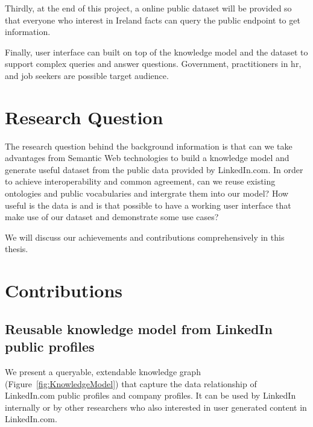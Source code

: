 Thirdly, at the end of this project, a online public dataset will be provided so that everyone who interest in Ireland facts can query the public endpoint to get information.

Finally, user interface can built on top of the knowledge model and the dataset to support complex queries and answer questions. Government, practitioners in \gls{hr}, and job seekers are possible target audience.

%
%

\section{Research Question}
The research question behind the background information is that can we take advantages from Semantic Web technologies to build a knowledge model and generate useful dataset from the public data provided by LinkedIn.com. In order to achieve interoperability and common agreement, can we reuse existing ontologies and public vocabularies and intergrate them into our model? How useful is the data is and is that possible to have a working user interface that make use of our dataset and demonstrate some use cases?

We will discuss our achievements and contributions comprehensively in this thesis.

\section{Contributions}
\subsection{Reusable knowledge model from LinkedIn public profiles}
We present a queryable, extendable knowledge graph (Figure~\ref{fig:KnowledgeModel}) that capture the data relationship of LinkedIn.com public profiles and company profiles. It can be used by LinkedIn internally or by other researchers who also interested in user generated content in LinkedIn.com.

